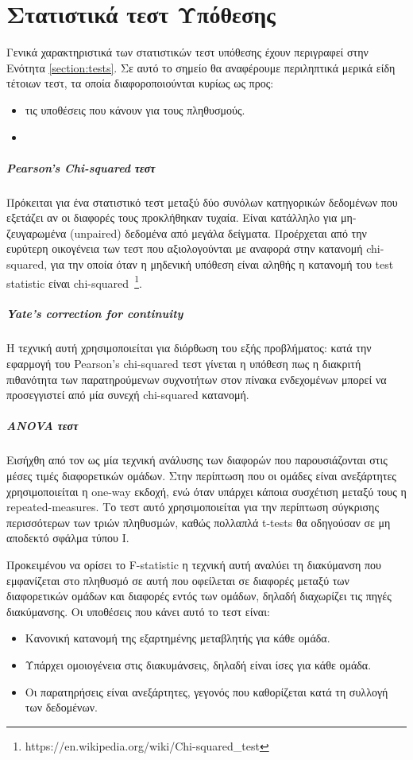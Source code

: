 \chapter{Στατιστικά τεστ Υπόθεσης}
\label{appendix:Tests}
Γενικά χαρακτηριστικά των στατιστικών τεστ υπόθεσης έχουν περιγραφεί στην Ενότητα \ref{section:tests}. Σε αυτό το σημείο θα αναφέρουμε περιληπτικά μερικά είδη τέτοιων τεστ, τα οποία διαφοροποιούνται κυρίως ως προς:
\begin{itemize}
	\item τις υποθέσεις που κάνουν για τους πληθυσμούς.
	\item 
\end{itemize}
\paragraph{Pearson's Chi-squared τεστ}
Πρόκειται για ένα στατιστικό τεστ μεταξύ δύο συνόλων κατηγορικών δεδομένων που εξετάζει αν οι διαφορές τους προκλήθηκαν τυχαία. Είναι κατάλληλο για μη-ζευγαρωμένα (unpaired) δεδομένα από μεγάλα δείγματα. Προέρχεται από την ευρύτερη οικογένεια των τεστ που αξιολογούνται με αναφορά στην κατανομή chi-squared, για την οποία όταν η μηδενική υπόθεση είναι αληθής η κατανομή του test statistic είναι chi-squared~\footnote{https://en.wikipedia.org/wiki/Chi-squared\_test}. 
\paragraph{Yate's correction for continuity}
Η τεχνική αυτή χρησιμοποιείται για διόρθωση του εξής προβλήματος: κατά την εφαρμογή του Pearson's chi-squared τεστ γίνεται η υπόθεση πως η διακριτή πιθανότητα των παρατηρούμενων συχνοτήτων στον πίνακα ενδεχομένων μπορεί να προσεγγιστεί από μία συνεχή chi-squared κατανομή.
\paragraph{ANOVA τεστ} Εισήχθη από τον \citet{QJ:QJ49708235130} ως μία τεχνική ανάλυσης των διαφορών που παρουσιάζονται στις μέσες τιμές διαφορετικών ομάδων. Στην περίπτωση που οι ομάδες είναι ανεξάρτητες χρησιμοποιείται η one-way εκδοχή, ενώ όταν υπάρχει κάποια συσχέτιση μεταξύ τους η repeated-measures. Το τεστ αυτό χρησιμοποιείται για την περίπτωση σύγκρισης περισσότερων των τριών πληθυσμών, καθώς πολλαπλά t-tests θα οδηγούσαν σε μη αποδεκτό σφάλμα τύπου Ι. 

Προκειμένου να ορίσει το F-statistic η τεχνική αυτή αναλύει τη διακύμανση που εμφανίζεται στο πληθυσμό σε αυτή που οφείλεται σε διαφορές μεταξύ των διαφορετικών ομάδων και διαφορές εντός των ομάδων, δηλαδή διαχωρίζει τις πηγές διακύμανσης. Οι υποθέσεις που κάνει αυτό το τεστ είναι:
\begin{itemize}
	\item Κανονική κατανομή της εξαρτημένης μεταβλητής για κάθε ομάδα.
	\item Υπάρχει ομοιογένεια στις διακυμάνσεις, δηλαδή είναι ίσες για κάθε ομάδα.
	\item Οι παρατηρήσεις είναι ανεξάρτητες, γεγονός που καθορίζεται κατά τη συλλογή των δεδομένων.
\end{itemize}


